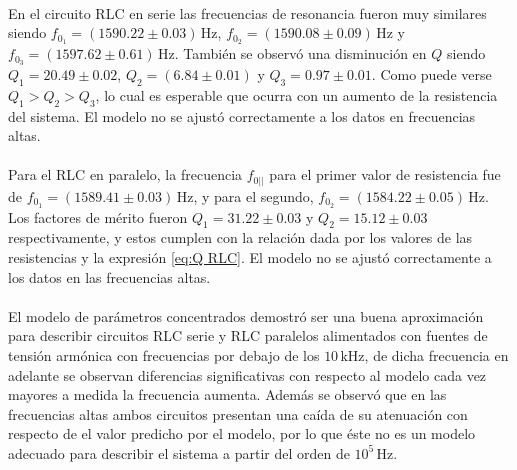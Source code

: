 

\paragraph{}En el circuito RLC en serie las frecuencias de resonancia fueron muy similares siendo $f_{0_1}= (1590.22 \pm 0.03)\,$Hz, $f_{0_2}=(1590.08 \pm 0.09)\,$Hz y $f_{0_3}=(1597.62 \pm 0.61)\,$Hz. 
También se observó una disminución en $Q$ siendo $Q_1= 20.49 \pm 0.02$, $Q_2 = (6.84 \pm 0.01)$ y $Q_3 = 0.97 \pm 0.01$. Como puede verse $Q_1 > Q_2 > Q_3$, lo cual es esperable que ocurra con un aumento de la resistencia del sistema. El modelo no se ajustó correctamente a los datos en frecuencias altas.
\paragraph{}Para el RLC en paralelo, la frecuencia $f_{0||}$ para el primer valor de resistencia fue de $f_{0_1} = (1589.41 \pm 0.03)\,$Hz, y para el segundo, $f_{0_2} = (1584.22 \pm 0.05)\,$Hz. Los factores de mérito fueron $Q_1=31.22 \pm 0.03$ y $Q_2=15.12 \pm 0.03$ respectivamente, y estos cumplen con la relación dada por los valores de las resistencias y la expresión \eqref{eq:Q RLC}. El modelo no se ajustó correctamente a los datos en las frecuencias altas.
\paragraph{}
El modelo de parámetros concentrados demostró ser una buena aproximación para describir circuitos RLC serie y RLC paralelos alimentados con fuentes de tensión armónica con frecuencias por debajo de los $10\,\mathrm{kHz}$, de dicha frecuencia en adelante se observan diferencias significativas con respecto al modelo cada vez mayores a medida la frecuencia aumenta.
Además se observó que en las frecuencias altas ambos circuitos presentan una caída de su atenuación con respecto de el valor predicho por el modelo, por lo que éste no es un modelo adecuado para describir el sistema a partir del orden de $10^5\,$Hz.